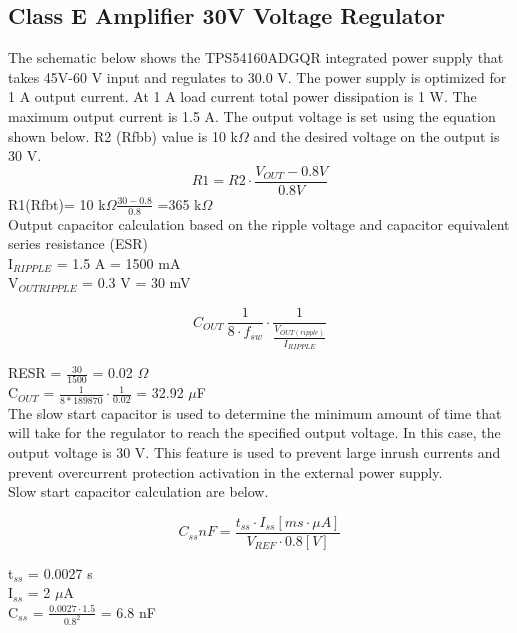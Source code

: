 \documentclass[12pt]{article}
\begin{document}
\subsection{Class E Amplifier 30V Voltage Regulator}

\indent \indent
The schematic below shows the TPS54160ADGQR integrated power supply that takes 45V-60 V input and regulates to 30.0 V. The power supply is optimized for 1 A output current. At 1 A load current total power dissipation is 1 W.  The maximum output current is 1.5 A. The output voltage is set using the equation shown below. R2 (Rfbb) value is 10 k$\Omega$ and the desired voltage on the output is 30 V.\\

\begin{equation}
R1 = R2 \cdot \frac{V_{OUT} - 0.8 V}{0.8 V}
\end{equation}
R1(Rfbt)= 10 k$\Omega \frac{30-0.8}{0.8}$ =365 k$\Omega$\\
Output capacitor calculation based on the ripple voltage and capacitor equivalent series resistance (ESR)\\

\noindent
I$_{RIPPLE}$ = 1.5 A = 1500 mA \\
V$_{OUT RIPPLE}$ = 0.3 V = 30 mV

\begin{equation}
C_{OUT} \> \frac{1}{8 \cdot f_{sw}} \cdot \frac{1}{\frac{V_{OUT(ripple)}}{I_{RIPPLE}}}
\end{equation}

\noindent
RESR = $\frac{30}{1500}$ = 0.02 $\Omega$\\
C$_{OUT}$ = $\frac{1}{8*189870}\cdot \frac{1}{0.02}$ = 32.92 $\mu$F\\

\indent
The slow start capacitor is used to determine the minimum amount of time that will take for the regulator to reach the specified output voltage. In this case, the output voltage is 30 V. This feature is used to prevent large inrush currents and prevent overcurrent protection activation in the external power supply.\\

\noindent
Slow start capacitor calculation are below.

\begin{equation}
C_{ss} nF = \frac{t_{ss} \cdot I_{ss} [ms\cdot \mu A]}{V_{REF} \cdot 0.8 [V]}
\end{equation}

\noindent
t$_{ss}$ = 0.0027 s\\
I$_{ss}$ = 2 $\mu$A\\
C$_{ss}$ = $\frac{0.0027 \cdot 1.5}{0.8^2}$ = 6.8 nF \\
\end{document}
